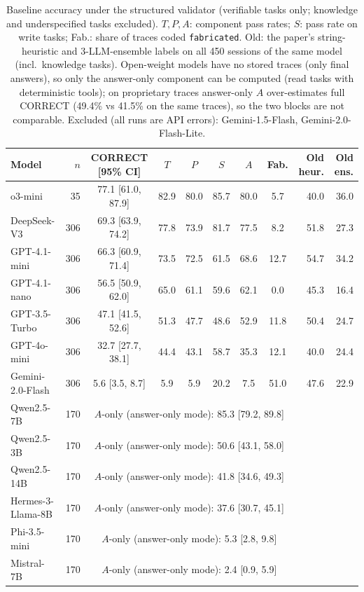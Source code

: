 \begin{table}[t]
\centering
\caption{Baseline accuracy under the structured validator (verifiable tasks only; knowledge and underspecified tasks
excluded). $T,P,A$: component pass rates; $S$: pass rate on write tasks; Fab.: share of traces coded
\texttt{fabricated}. Old: the paper's string-heuristic and 3-LLM-ensemble labels on all 450 sessions of the same model
(incl.\ knowledge tasks). Open-weight models have no stored traces (only final answers), so only the answer-only
component can be computed (read tasks with deterministic tools); on proprietary traces answer-only $A$ over-estimates
full CORRECT (49.4\% vs 41.5\% on the same traces), so the two blocks are not comparable.
Excluded (all runs are API errors): Gemini-1.5-Flash, Gemini-2.0-Flash-Lite.}
\label{tab:validator-models}
\small
\begin{tabular}{@{}lrccccccrr@{}}
\toprule
Model & $n$ & CORRECT [95\% CI] & $T$ & $P$ & $S$ & $A$ & Fab. & Old heur. & Old ens. \\
\midrule
o3-mini & 35 & 77.1 [61.0, 87.9] & 82.9 & 80.0 & 85.7 & 80.0 & 5.7 & 40.0 & 36.0 \\
DeepSeek-V3 & 306 & 69.3 [63.9, 74.2] & 77.8 & 73.9 & 81.7 & 77.5 & 8.2 & 51.8 & 27.3 \\
GPT-4.1-mini & 306 & 66.3 [60.9, 71.4] & 73.5 & 72.5 & 61.5 & 68.6 & 12.7 & 54.7 & 34.2 \\
GPT-4.1-nano & 306 & 56.5 [50.9, 62.0] & 65.0 & 61.1 & 59.6 & 62.1 & 0.0 & 45.3 & 16.4 \\
GPT-3.5-Turbo & 306 & 47.1 [41.5, 52.6] & 51.3 & 47.7 & 48.6 & 52.9 & 11.8 & 50.4 & 24.7 \\
GPT-4o-mini & 306 & 32.7 [27.7, 38.1] & 44.4 & 43.1 & 58.7 & 35.3 & 12.1 & 40.0 & 24.4 \\
Gemini-2.0-Flash & 306 & 5.6 [3.5, 8.7] & 5.9 & 5.9 & 20.2 & 7.5 & 51.0 & 47.6 & 22.9 \\
\midrule
Qwen2.5-7B & 170 & \multicolumn{6}{c}{$A$-only (answer-only mode): 85.3 [79.2, 89.8]} & & \\
Qwen2.5-3B & 170 & \multicolumn{6}{c}{$A$-only (answer-only mode): 50.6 [43.1, 58.0]} & & \\
Qwen2.5-14B & 170 & \multicolumn{6}{c}{$A$-only (answer-only mode): 41.8 [34.6, 49.3]} & & \\
Hermes-3-Llama-8B & 170 & \multicolumn{6}{c}{$A$-only (answer-only mode): 37.6 [30.7, 45.1]} & & \\
Phi-3.5-mini & 170 & \multicolumn{6}{c}{$A$-only (answer-only mode): 5.3 [2.8, 9.8]} & & \\
Mistral-7B & 170 & \multicolumn{6}{c}{$A$-only (answer-only mode): 2.4 [0.9, 5.9]} & & \\
\bottomrule
\end{tabular}
\end{table}
